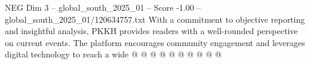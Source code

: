 \begin{textsample}{NEG Dim 3 – global\_south\_2025\_01 – Score -1.00 – global\_south\_2025\_01/120634757.txt}
With a commitment to objective reporting and insightful analysis, PKKH provides readers with a well-rounded perspective on current events.
The platform encourages community engagement and leverages digital technology to reach a wide @ @ @ @ @ @ @ @ @ @

\end{textsample}

